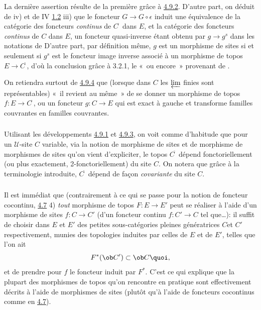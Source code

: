 \documentclass[10pt]{../fichiers-configuration-latex/smfart}
\begin{document}
La dernière assertion résulte de la première grâce à
\hyperref[IV.subsubsec4.9.2]{4.9.2}. D'autre part, on déduit de
 iv) et de IV \hyperref[IV.theo1.2]{1.2} iii) que le foncteur
$G\rightarrow G\circ \epsilon$ induit une équivalence de la
catégorie des foncteurs \emph{continus} de
$C^{\widetilde{\phantom{,}}}$ dans $E$, et la catégorie des
foncteurs \emph{continus} de $C$ dans $E$, un foncteur quasi-inverse
étant obtenu par $g\rightarrow g^s$ dans les notations de \loccit
D'autre part, par définition même, $g$ est un morphisme de sites
si et seulement si $g^s$ est le foncteur image inverse associé à
un morphisme de topos $E\rightarrow C^{\widetilde{\phantom{,}}}$,
d'où la conclusion grâce à 3.2.1, le « ou encore »
provenant de .

On retiendra surtout de \hyperref[IV.prop4.9.4]{4.9.4} que (lorsque dans $C$ les
$\varprojlim$ finies sont représentables) « il revient au même » de se donner un morphisme de topos $f:E\rightarrow
C^{\widetilde{\phantom{,}}}$, ou un foncteur $g:C\rightarrow E$ qui
est exact à gauche et transforme familles couvrantes en familles
couvrantes.

\setcounter{subsubsection}{4}
\subsubsection{}
Utilisant les développements \hyperref[IV.subsubsec4.9.1]{4.9.1} et
\hyperref[IV.subsubsec4.9.3]{4.9.3}, on voit comme d'habitude que pour un
$𝒰$-site $C$ variable, via la notion de morphisme de sites
et de morphisme de morphismes de sites qu'on vient d'expliciter, le
topos $C^{\widetilde{\phantom{,}}}$ dépend fonctoriellement (ou
plus exactement, 2-fonctoriellement) du site $C$. On notera que
grâce à la terminologie introduite,
$C^{\widetilde{\phantom{,}}}$ dépend de façon \emph{covariante}
du site $C$.

\subsubsection{}
Il est immédiat que (contrairement à ce qui se passe pour la notion
de foncteur cocontinu, \cf \hyperref[IV.subsec4.7]{4.7} 4) \emph{tout}
morphisme de topos $F:E\rightarrow E'$ peut se réaliser à l'aide
d'un morphisme de sites $f:C\rightarrow C'$ (\ie d'un foncteur
continu $f:C'\rightarrow C$ tel que\ldots): il suffit de choisir
dans $E$ et $E'$ des petites sous-catégories pleines génératrices
$C$\pageoriginale et $C'$ respectivement, munies des topologies
induites par celles de $E$ et de $E'$, telles que l'on ait
$$
F^{\ast}(\ob C')\subset \ob C{\quoi},
$$
et de prendre pour $f$ le foncteur induit par $F^{\ast}$. C'est ce
qui explique que la plupart des morphismes de topos qu'on rencontre
en pratique sont effectivement décrits à l'aide de morphismes de
sites (plutôt qu'à l'aide de foncteurs cocontinus comme en
\hyperref[IV.subsec4.7]{4.7}).
\end{document}
